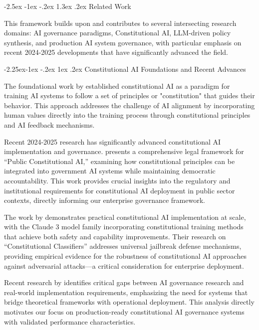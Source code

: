 \documentclass[manuscript,screen,9pt]{acmart}
\makeatletter
\renewcommand\section{\@startsection{section}{1}{\z@}%
  {-2.5ex \@plus -1ex \@minus -.2ex}%
  {1.3ex \@plus.2ex}%
  {\normalfont\Large\bfseries}}
\renewcommand\subsection{\@startsection{subsection}{2}{\z@}%
  {-2.25ex\@plus -1ex \@minus -.2ex}%
  {1ex \@plus .2ex}%
  {\normalfont\large\bfseries}}
\makeatother
\begin{document}
\begin{table}[!htb]
\FloatBarrier %
\section{Related Work}
\label{sec:related_work}

This framework builds upon and contributes to several intersecting research domains: AI governance paradigms, Constitutional AI, LLM-driven policy synthesis, and production AI system governance, with particular emphasis on recent 2024-2025 developments that have significantly advanced the field.

\subsection{Constitutional AI Foundations and Recent Advances}

The foundational work by \citet{Bai2025ConstitutionalAI} established constitutional AI as a paradigm for training AI systems to follow a set of principles or "constitution" that guides their behavior. This approach addresses the challenge of AI alignment by incorporating human values directly into the training process through constitutional principles and AI feedback mechanisms.

Recent 2024-2025 research has significantly advanced constitutional AI implementation and governance. \citet{Abiri2025PublicConstitutional} presents a comprehensive legal framework for ``Public Constitutional AI,'' examining how constitutional principles can be integrated into government AI systems while maintaining democratic accountability. This work provides crucial insights into the regulatory and institutional requirements for constitutional AI deployment in public sector contexts, directly informing our enterprise governance framework.

The work by \citet{Anthropic2024Claude3} demonstrates practical constitutional AI implementation at scale, with the Claude 3 model family incorporating constitutional training methods that achieve both safety and capability improvements. Their research on ``Constitutional Classifiers'' \cite{Anthropic2025Constitutional} addresses universal jailbreak defense mechanisms, providing empirical evidence for the robustness of constitutional AI approaches against adversarial attacks---a critical consideration for enterprise deployment.

Recent research by \citet{SSRC2025AIGovernance} identifies critical gaps between AI governance research and real-world implementation requirements, emphasizing the need for systems that bridge theoretical frameworks with operational deployment. This analysis directly motivates our focus on production-ready constitutional AI governance systems with validated performance characteristics.


\end{table}
\end{document}
